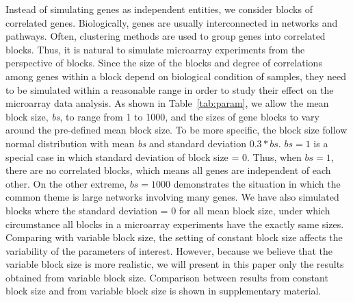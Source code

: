 \documentclass[11pt]{article}
\begin{document}
Instead of simulating genes as independent entities, we consider
blocks of correlated genes. Biologically, genes are usually
interconnected in networks and pathways. Often, clustering methods are
used to group genes into correlated blocks. Thus, it is natural to
simulate microarray experiments from the perspective of blocks. Since
the size of the blocks and degree of correlations among genes within a
block depend on biological condition of samples, they need to be
simulated within a reasonable range in order to study their effect on
the microarray data analysis. As shown in Table~\ref{tab:param}, we
allow the mean block size, \textit{bs}, to range from 1 to 1000, and
the sizes of gene blocks to vary around the pre-defined mean block
size. To be more specific, the block size follow normal distribution
with mean \textit{bs} and standard deviation $0.3*bs$. $bs=1$ is a
special case in which standard deviation of block size = 0. Thus, when
$bs=1$, there are no correlated blocks, which means all genes are
independent of each other. On the other extreme, $bs=1000$
demonstrates the situation in which the common theme is large networks
involving many genes. We have also simulated blocks where the standard
deviation = 0 for all mean block size, under which circumstance all
blocks in a microarray experiments have the exactly same
sizes. Comparing with variable block size, the setting of constant
block size affects the variability of the parameters of
interest. However, because we believe that the variable block size is
more realistic, we will present in this paper only the results
obtained from variable block size. Comparison between results from
constant block size and from variable block size is shown in
supplementary material.
\end{document}
